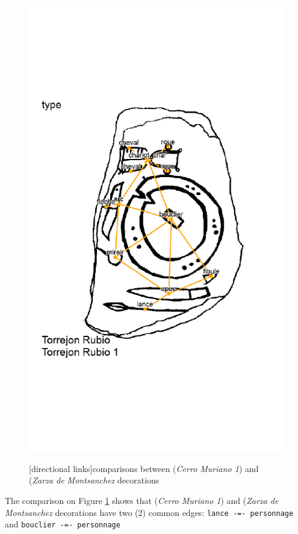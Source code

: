 \documentclass[article]{jss}\usepackage[]{graphicx}\usepackage[]{color}
\makeatletter
\def\maxwidth{ %
  \ifdim\Gin@nat@width>\linewidth
    \linewidth
  \else
    \Gin@nat@width
  \fi
}
\newenvironment{knitrout}{}{} %
\makeatother
\begin{document}
\begin{figure}[H]
\begin{knitrout}
\includegraphics[width=\maxwidth]{figure/unnamed-chunk-11-1} 

\end{knitrout}
[directional links]{comparisons between  (\emph{Cerro Muriano 1}) and  (\emph{Zarza de Montsanchez} decorations}
\label{edg_comp}
\end{figure}

The comparison on Figure \ref{edg_comp} shows that  (\emph{Cerro Muriano 1}) and  (\emph{Zarza de Montsanchez} decorations have two (2) common edges: \texttt{lance -=- personnage} and \texttt{bouclier -=- personnage}
\end{document}
